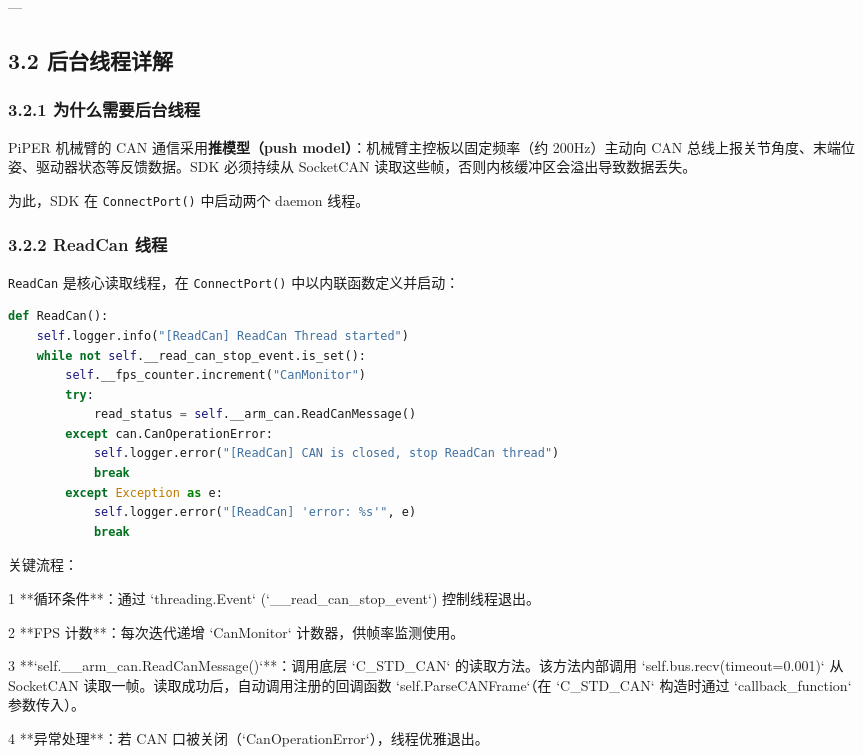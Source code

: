 \documentclass[UTF8,a4paper,11pt]{ctexart}
\begin{document}
---

\subsection{3.2 后台线程详解}

\subsubsection{3.2.1 为什么需要后台线程}

PiPER 机械臂的 CAN 通信采用\textbf{推模型（push model）}：机械臂主控板以固定频率（约 200Hz）主动向 CAN 总线上报关节角度、末端位姿、驱动器状态等反馈数据。SDK 必须持续从 SocketCAN 读取这些帧，否则内核缓冲区会溢出导致数据丢失。

为此，SDK 在 \texttt{ConnectPort()} 中启动两个 daemon 线程。

\subsubsection{3.2.2 ReadCan 线程}

\texttt{ReadCan} 是核心读取线程，在 \texttt{ConnectPort()} 中以内联函数定义并启动：

\begin{lstlisting}[language=python]
def ReadCan():
    self.logger.info("[ReadCan] ReadCan Thread started")
    while not self.__read_can_stop_event.is_set():
        self.__fps_counter.increment("CanMonitor")
        try:
            read_status = self.__arm_can.ReadCanMessage()
        except can.CanOperationError:
            self.logger.error("[ReadCan] CAN is closed, stop ReadCan thread")
            break
        except Exception as e:
            self.logger.error("[ReadCan] 'error: %s'", e)
            break
\end{lstlisting}

关键流程：

\item[1] **循环条件**：通过 `threading.Event` (`__read_can_stop_event`) 控制线程退出。
\item[2] **FPS 计数**：每次迭代递增 `CanMonitor` 计数器，供帧率监测使用。
\item[3] **`self.__arm_can.ReadCanMessage()`**：调用底层 `C_STD_CAN` 的读取方法。该方法内部调用 `self.bus.recv(timeout=0.001)` 从 SocketCAN 读取一帧。读取成功后，自动调用注册的回调函数 `self.ParseCANFrame`（在 `C_STD_CAN` 构造时通过 `callback_function` 参数传入）。
\item[4] **异常处理**：若 CAN 口被关闭（`CanOperationError`），线程优雅退出。
\end{document}
